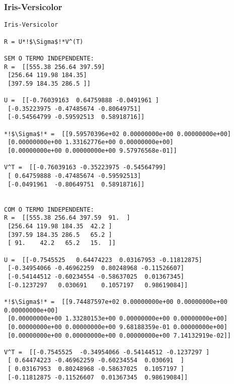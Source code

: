 \documentclass[a4paper,12pt,twoside]{article}
\begin{document}
\subsubsection{Iris-Versicolor}
\begin{lstlisting}
Iris-Versicolor

R = U*!$\Sigma$!*V^(T)

SEM O TERMO INDEPENDENTE: 
R =  [[555.38 256.64 397.59]
 [256.64 119.98 184.35]
 [397.59 184.35 286.5 ]]

U =  [[-0.76039163  0.64759888 -0.0491961 ]
 [-0.35223975 -0.47485674 -0.80649751]
 [-0.54564799 -0.59592513  0.58918716]]

*!$\Sigma$!* =  [[9.59570396e+02 0.00000000e+00 0.00000000e+00]
 [0.00000000e+00 1.33162776e+00 0.00000000e+00]
 [0.00000000e+00 0.00000000e+00 9.57976568e-01]]

V^T =  [[-0.76039163 -0.35223975 -0.54564799]
 [ 0.64759888 -0.47485674 -0.59592513]
 [-0.0491961  -0.80649751  0.58918716]]


COM O TERMO INDEPENDENTE: 
R =  [[555.38 256.64 397.59  91.  ]
 [256.64 119.98 184.35  42.2 ]
 [397.59 184.35 286.5   65.2 ]
 [ 91.    42.2   65.2   15.  ]]

U =  [[-0.7545525   0.64474223  0.03167953 -0.11812875]
 [-0.34954066 -0.46962259  0.80248968 -0.11526607]
 [-0.54144512 -0.60234554 -0.58637025  0.01367345]
 [-0.1237297   0.030691    0.1057197   0.98619084]]

*!$\Sigma$!* =  [[9.74487597e+02 0.00000000e+00 0.00000000e+00 0.00000000e+00]
 [0.00000000e+00 1.33280153e+00 0.00000000e+00 0.00000000e+00]
 [0.00000000e+00 0.00000000e+00 9.68188359e-01 0.00000000e+00]
 [0.00000000e+00 0.00000000e+00 0.00000000e+00 7.14132919e-02]]

V^T =  [[-0.7545525  -0.34954066 -0.54144512 -0.1237297 ]
 [ 0.64474223 -0.46962259 -0.60234554  0.030691  ]
 [ 0.03167953  0.80248968 -0.58637025  0.1057197 ]
 [-0.11812875 -0.11526607  0.01367345  0.98619084]]
\end{lstlisting}
\end{document}
